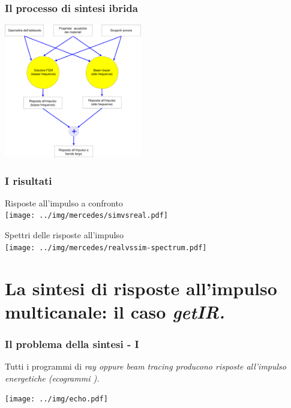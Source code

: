 \documentclass[10pt]{beamer}
\begin{document}
\begin{frame}
  \frametitle{Il processo di sintesi ibrida}

  \begin{center}
    \includegraphics[width = 6cm]{graph/hybridSimulationsFlowDiag-slides.pdf}
  \end{center}
  
\end{frame}

\begin{frame}
  \frametitle{I risultati}

  \begin{center}
    Risposte all'impulso a confronto\\
    \texttt{[image: ../img/mercedes/simvsreal.pdf]}\\
    \pause
    \vskip 0.3cm

    Spettri delle risposte all'impulso \\
    \texttt{[image: ../img/mercedes/realvssim-spectrum.pdf]}\\
  \end{center}


\end{frame}

\section{La sintesi di risposte all'impulso multicanale: il caso \em getIR.}

\begin{frame}
   \frametitle{Il problema della sintesi - I}
   Tutti i programmi di \em ray \em oppure \em beam tracing \em  producono
   risposte all'impulso energetiche (\em ecogrammi \em).
   \vskip 0.5cm
   \begin{center}
     \texttt{[image: ../img/echo.pdf]}
   \end{center}
\end{frame}
\end{document}
